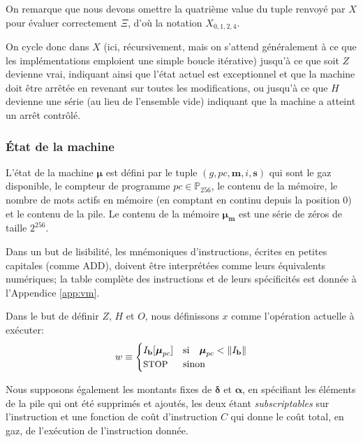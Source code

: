 \documentclass[9pt,oneside]{amsart}
\begin{document}
\begin{multicols}{2}
On remarque que nous devons omettre la quatrième value du tuple renvoyé par $X$ pour évaluer correctement $\Xi$, d'où la notation $X_{0,1,2,4}$.

On cycle donc dans $X$ (ici, récursivement, mais on s'attend généralement à ce que les implémentations emploient une simple boucle itérative) jusqu'à ce que soit $Z$ devienne vrai, indiquant ainsi que l'état actuel est exceptionnel et que la machine doit être arrêtée en revenant sur toutes les modifications, ou jusqu'à ce que $H$ devienne une série (au lieu de l'ensemble vide) indiquant que la machine a atteint un arrêt contrôlé.

\subsubsection{État de la machine}
L'état de la machine $\boldsymbol{\mu}$ est défini par le tuple $(g, pc, \mathbf{m}, i, \mathbf{s})$ qui sont le gaz disponible, le compteur de programme $pc \in \mathbb{P}_{256}$, le contenu de la mémoire, le nombre de mots actifs en mémoire (en comptant en continu depuis la position 0) et le contenu de la pile. Le contenu de la mémoire $\boldsymbol{\mu}_\mathbf{m}$ est une série de zéros de taille $2^{256}$.

Dans un but de lisibilité, les mnémoniques d'instructions, écrites en petites capitales (comme {\small ADD}), doivent être interprétées comme leurs équivalents numériques; la table complète des instructions et de leurs spécificités est donnée à l'Appendice \ref{app:vm}.

Dans le but de définir $Z$, $H$ et $O$, nous définissons $x$ comme l'opération actuelle à exécuter:
\begin{equation}\label{eq:currentoperation}
w \equiv \begin{cases} I_\mathbf{b}[\boldsymbol{\mu}_{pc}] & \text{si} \quad \boldsymbol{\mu}_{pc} < \lVert I_\mathbf{b} \rVert \\
\text{\small STOP} & \text{sinon}
\end{cases}
\end{equation}

Nous supposons également les montants fixes de $\mathbf{\delta}$ et $\mathbf{\alpha}$, en spécifiant les éléments de la pile qui ont été supprimés et ajoutés, les deux étant \textit{subscriptables} sur l'instruction et une fonction de coût d'instruction $C$ qui donne le coût total, en gaz, de l'exécution de l'instruction donnée.


\end{multicols}
\end{document}
